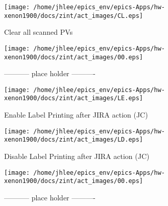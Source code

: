 \noindent
\vspace{1.4cm}
\begin{minipage}{.2\textwidth}
\begin{center}
\texttt{[image: /home/jhlee/epics\_env/epics-Apps/hw-xenon1900/docs/zint/act\_images/CL.eps]}
\end{center}
\end{minipage}
\begin{minipage}{.7\textwidth}
Clear all scanned PVs
\end{minipage}


\noindent
\vspace{1.4cm}
\begin{minipage}{.2\textwidth}
\begin{center}
\texttt{[image: /home/jhlee/epics\_env/epics-Apps/hw-xenon1900/docs/zint/act\_images/00.eps]}
\end{center}
\end{minipage}
\begin{minipage}{.7\textwidth}
----------- place holder ----------
\end{minipage}


\noindent
\vspace{1.4cm}
\begin{minipage}{.2\textwidth}
\begin{center}
\texttt{[image: /home/jhlee/epics\_env/epics-Apps/hw-xenon1900/docs/zint/act\_images/LE.eps]}
\end{center}
\end{minipage}
\begin{minipage}{.7\textwidth}
Enable Label Printing after JIRA action (JC)
\end{minipage}


\noindent
\vspace{1.4cm}
\begin{minipage}{.2\textwidth}
\begin{center}
\texttt{[image: /home/jhlee/epics\_env/epics-Apps/hw-xenon1900/docs/zint/act\_images/LD.eps]}
\end{center}
\end{minipage}
\begin{minipage}{.7\textwidth}
Disable Label Printing after JIRA action (JC)
\end{minipage}


\noindent
\vspace{1.4cm}
\begin{minipage}{.2\textwidth}
\begin{center}
\texttt{[image: /home/jhlee/epics\_env/epics-Apps/hw-xenon1900/docs/zint/act\_images/00.eps]}
\end{center}
\end{minipage}
\begin{minipage}{.7\textwidth}
----------- place holder ----------
\end{minipage}


